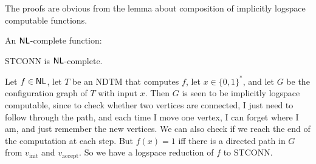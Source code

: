 \documentclass{article}
\begin{document}
\proof The proofs are obvious from the lemma about composition of implicitly logspace computable functions. \endproof 
\begin{ex*}
    An $\mathsf{NL}$-complete function: 
    \begin{fancyprop}{}
        STCONN is $\mathsf{NL}$-complete.
    \end{fancyprop}
    \proof Let $f \in \mathsf{NL}$, let $T$ be an NDTM that computes $f$, let $x \in \{0,1\}^{*}$, and let $G$ be the configuration graph of $T$ with input $x$. Then $G$ is seen to be implicitly logspace computable, since to check whether two vertices are connected, I just need to follow through the path, and each time I move one vertex, I can forget where I am, and just remember the new vertices. We can also check if we reach the end of the computation at each step.\gap 
    But $f(x)=1$ iff there is a directed path in $G$ from $v_{\text{init}}$ and $v_{\text{accept}}$. So we have a logspace reduction of $f$ to STCONN.
\end{ex*}
\end{document}
